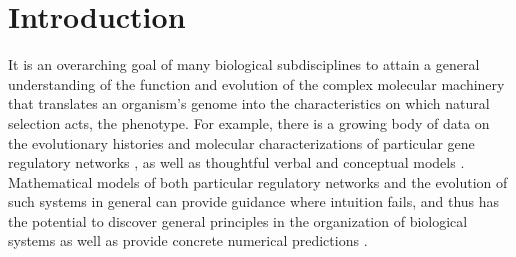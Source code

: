 \documentclass{article}
\newcommand{\plr}[1]{\todo[color=blue!25]{#1}}
\newcommand{\plri}[1]{{\color{blue}\it #1}}
\newcommand{\plr}[1]{{\color{blue}\it #1}}
\newcommand{\plri}[1]{\plr{#1}}
\newcommand{\1}{\mathbbm{1}}
\begin{document}



\section*{Introduction}

It is an overarching goal of many biological subdisciplines 
to attain a general understanding of the function and evolution of the 
complex molecular machinery that translates an organism's genome 
into the characteristics on which natural selection acts,
the phenotype.
For example, 
there is a growing body of data on the evolutionary histories and molecular characterizations of particular gene regulatory networks
\citep{jaeger2011gap, davidson2006gene, israel2016comparative}, 
as well as thoughtful verbal and conceptual models \citep{true2001developmental, weiss2000phenogenetic, edelman2001degeneracy, pavlicev2012model}. 
Mathematical models of both particular regulatory networks
and the evolution of such systems in general
can provide guidance where intuition fails,
and thus has the potential to discover general principles in the organization of biological systems 
as well as provide concrete numerical predictions \citep{servedio2014not}.
\end{document}
